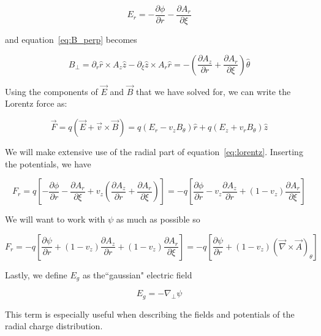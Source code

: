 \documentclass[aps,prl,preprint,groupedaddress]{revtex4-1}
\begin{document}
\begin{equation}\label{E_r}
E_r = -\frac{\partial \phi}{\partial r} - \frac{\partial A_r}{\partial \xi}
\end{equation}

and equation~\ref{eq:B_perp} becomes

\begin{equation}\label{B_theta}
B_\perp = \partial_r \hat{r} \times A_z \hat{z} - \partial_\xi \hat{z} \times A_r \hat{r} = -\left(\frac{\partial A_z}{\partial r} + \frac{\partial A_r}{\partial \xi}\right)\hat{\theta}
\end{equation}

Using the components of $\vec{E}$ and $\vec{B}$ that we have solved for, we can write the Lorentz force as:

\begin{equation}\label{eq:lorentz}
\vec{F} = q(\vec{E} + \vec{v} \times \vec{B}) = q(E_r - v_z B_\theta)\hat{r} + q(E_z + v_r B_\theta)\hat{z}
\end{equation}

We will make extensive use of the radial part of equation~\ref{eq:lorentz}. Inserting the potentials, we have

\begin{equation}\label{eq:F_r}
F_r = q\left[-\frac{\partial \phi}{\partial r} - \frac{\partial A_r}{\partial \xi} + v_z\left(\frac{\partial A_z}{\partial r} + \frac{\partial A_r}{\partial \xi}\right)\right] = -q\left[\frac{\partial \phi}{\partial r} - v_z \frac{\partial A_z}{\partial r} +(1-v_z) \frac{\partial A_r}{\partial \xi}\right]
\end{equation}

We will want to work with $\psi$ as much as possible so

\begin{equation}\label{eq:F_wPsi}
F_r = -q\left[\frac{\partial \psi}{\partial r} + (1-v_z)\frac{\partial A_z}{\partial r} + (1-v_z)\frac{\partial A_r}{\partial \xi}\right] = -q\left[\frac{\partial \psi}{\partial r} + (1-v_z)(\vec{\nabla} \times \vec{A})_\theta \right] 
\end{equation}

Lastly, we define $E_g$ as the``gaussian" electric field

\begin{equation}\label{eq:E_guass}
E_g = -\nabla_\perp \psi
\end{equation}

This term is especially useful when describing the fields and potentials of the radial charge distribution.
\end{document}
